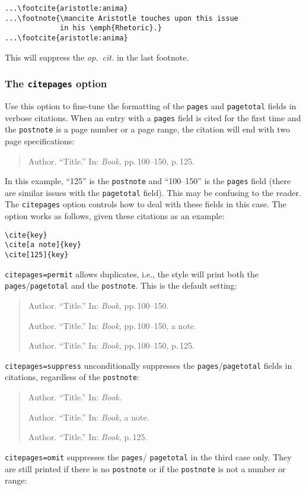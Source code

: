 \documentclass[a4paper]{article}
\begin{document}
\begin{verbatim}
...\footcite{aristotle:anima}
...\footnote{\mancite Aristotle touches upon this issue 
             in his \emph{Rhetoric}.}
...\footcite{aristotle:anima}
\end{verbatim}
%
This will suppress the \emph{op.~cit.} in the last footnote.

\subsubsection*{The \texttt{citepages} option}

Use this option to fine-tune the formatting of the \texttt{pages}
and \texttt{pagetotal} fields in verbose citations. When an entry
with a \texttt{pages} field is cited for the first time and the
\texttt{postnote} is a page number or a page range, the citation
will end with two page specifications:

\begin{quote}
Author. \enquote{Title.} In: \emph{Book,} pp.\,100--150, p.\,125.
\end{quote}
%
In this example, \enquote{125} is the \texttt{postnote} and
\enquote{100--150} is the \texttt{pages} field (there are similar
issues with the \texttt{pagetotal} field). This may be confusing to
the reader. The \texttt{citepages} option controls how to deal with
these fields in this case. The option works as follows, given these
citations as an example:

\begin{verbatim}
\cite{key}
\cite[a note]{key}
\cite[125]{key}
\end{verbatim}
%
\texttt{citepages=permit} allows duplicates, i.e., the style will
print both the \texttt{pages}\slash \texttt{pagetotal} and the
\texttt{postnote}. This is the default setting:

\begin{quote}
Author. \enquote{Title.} In: \emph{Book,} pp.\,100--150.

Author. \enquote{Title.} In: \emph{Book,} pp.\,100--150, a note.

Author. \enquote{Title.} In: \emph{Book,} pp.\,100--150, p.\,125.
\end{quote}
%
\texttt{citepages=suppress} unconditionally suppresses the
\texttt{pages}\slash \texttt{pagetotal} fields in citations,
regardless of the \texttt{postnote}:

\begin{quote}
Author. \enquote{Title.} In: \emph{Book.}

Author. \enquote{Title.} In: \emph{Book,} a note.

Author. \enquote{Title.} In: \emph{Book,} p.\,125.
\end{quote}
%
\texttt{citepages=omit} suppresses the \texttt{pages}\slash
\texttt{pagetotal} in the third case only. They are still printed if
there is no \texttt{postnote} or if the \texttt{postnote} is not a
number or range:
\end{document}
